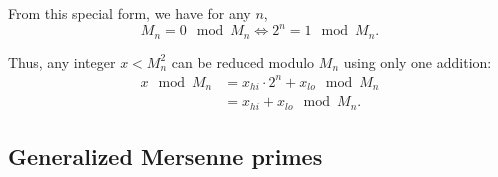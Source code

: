 \documentclass[a4paper]{article}
\begin{document}
From this special form, we have for any $n$,
\[
M_n = 0 \mod M_n \Longleftrightarrow 2^n = 1 \mod M_n.
\]

Thus, any integer $x < M_n^2$ can be reduced modulo $M_n$ using only one addition: 
\begin{align*}
x \mod M_n &= x_{hi}\cdot 2^{n} + x_{lo} \mod M_n \\
    &= x_{hi} + x_{lo} \mod M_n.
\end{align*}


\subsection{Generalized Mersenne primes}


\newpage
 
 
\nocite{*}
\end{document}
